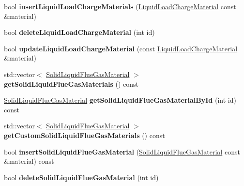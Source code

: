 \begin{DoxyCompactItemize}
\item 
\mbox{\label{class_s_q_lite_aff9ccdb8af003d3a0a3fdc9a85af77d8}} 
bool {\bfseries insert\+Liquid\+Load\+Charge\+Materials} (\hyperlink{class_liquid_load_charge_material}{Liquid\+Load\+Charge\+Material} const \&material)
\item 
\mbox{\label{class_s_q_lite_a2a3451cb60446d9a90da4cb08920dcfe}} 
bool {\bfseries delete\+Liquid\+Load\+Charge\+Material} (int id)
\item 
\mbox{\label{class_s_q_lite_a89805e7aeb9d72f5dfa6928aac681eab}} 
bool {\bfseries update\+Liquid\+Load\+Charge\+Material} (const \hyperlink{class_liquid_load_charge_material}{Liquid\+Load\+Charge\+Material} \&material)
\item 
\mbox{\label{class_s_q_lite_aecba5bffe035af787b17b5bf5997d825}} 
std\+::vector$<$ \hyperlink{class_solid_liquid_flue_gas_material}{Solid\+Liquid\+Flue\+Gas\+Material} $>$ {\bfseries get\+Solid\+Liquid\+Flue\+Gas\+Materials} () const
\item 
\mbox{\label{class_s_q_lite_aa7ea5aa679227d695fe38848236281ee}} 
\hyperlink{class_solid_liquid_flue_gas_material}{Solid\+Liquid\+Flue\+Gas\+Material} {\bfseries get\+Solid\+Liquid\+Flue\+Gas\+Material\+By\+Id} (int id) const
\item 
\mbox{\label{class_s_q_lite_a23b34dae2fa12690d3718755fc373b42}} 
std\+::vector$<$ \hyperlink{class_solid_liquid_flue_gas_material}{Solid\+Liquid\+Flue\+Gas\+Material} $>$ {\bfseries get\+Custom\+Solid\+Liquid\+Flue\+Gas\+Materials} () const
\item 
\mbox{\label{class_s_q_lite_aa1de7450c37a07dfd0541fdf0dc164ef}} 
bool {\bfseries insert\+Solid\+Liquid\+Flue\+Gas\+Material} (\hyperlink{class_solid_liquid_flue_gas_material}{Solid\+Liquid\+Flue\+Gas\+Material} const \&material) const
\item 
\mbox{\label{class_s_q_lite_ac83353062d75af65c5b01d55570d0ead}} 
bool {\bfseries delete\+Solid\+Liquid\+Flue\+Gas\+Material} (int id)
\item 
\mbox{\label{class_s_q_lite_aed13c3aeeef3fdf7f3b2d72b61dd93e8}} 

\end{DoxyCompactItemize}
